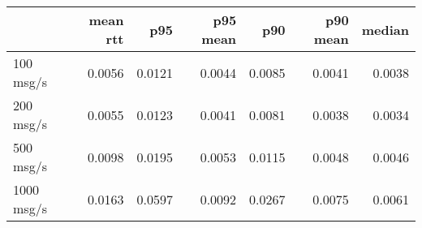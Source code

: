 \begin{tabular}{l|rrrrrr}
\rowcolor{gray!50}
 & mean rtt & p95 & p95 mean & p90 & p90 mean & median\\\hline
100 msg/s & 0.0056 & 0.0121 & 0.0044 & 0.0085 & 0.0041 & 0.0038 \\
200 msg/s & 0.0055 & 0.0123 & 0.0041 & 0.0081 & 0.0038 & 0.0034 \\
500 msg/s & 0.0098 & 0.0195 & 0.0053 & 0.0115 & 0.0048 & 0.0046 \\
1000 msg/s & 0.0163 & 0.0597 & 0.0092 & 0.0267 & 0.0075 & 0.0061 \\
\end{tabular}
